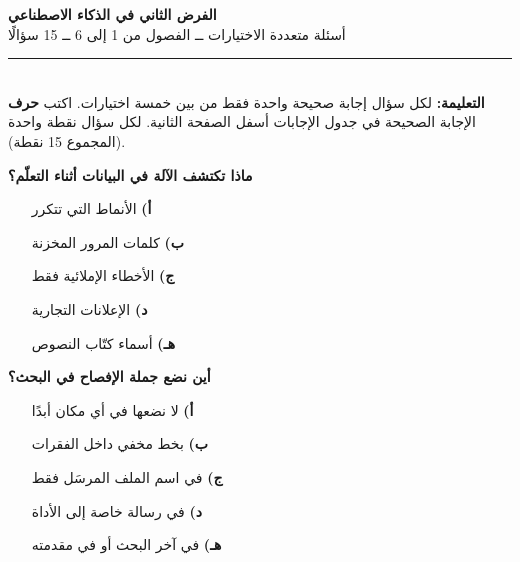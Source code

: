 \documentclass[11pt,a4paper]{article}
\begin{document}
\begin{center}
{\Large\khatt\textbf{الفرض الثاني في الذكاء الاصطناعي}}\\[2pt]
{\normalsize أسئلة متعددة الاختيارات ــ الفصول من 1 إلى 6 ــ 15 سؤالًا}
\end{center}
\vspace{-4pt}\rule{\textwidth}{0.6pt}\\
{\small\textbf{التعليمة:} لكل سؤال إجابة صحيحة واحدة فقط من بين خمسة اختيارات.
اكتب \textbf{حرف} الإجابة الصحيحة في جدول الإجابات أسفل الصفحة الثانية.
لكل سؤال نقطة واحدة (المجموع 15 نقطة).}
\vspace{-2pt}
\begin{multicols}{2}

\noindent\begin{minipage}{\linewidth}
\hangindent=0.7cm\textbf{ماذا تكتشف الآلة في البيانات أثناء التعلّم؟}
\begin{itemize}[leftmargin=0.95cm, labelsep=4pt, itemsep=0pt, topsep=2pt, parsep=0pt]
  \item[\textbf{أ)}] الأنماط التي تتكرر
  \item[\textbf{ب)}] كلمات المرور المخزنة
  \item[\textbf{ج)}] الأخطاء الإملائية فقط
  \item[\textbf{د)}] الإعلانات التجارية
  \item[\textbf{هـ)}] أسماء كتّاب النصوص
\end{itemize}
\end{minipage}\par\vspace{7pt plus 4pt}
\noindent\begin{minipage}{\linewidth}
\hangindent=0.7cm\textbf{أين نضع جملة الإفصاح في البحث؟}
\begin{itemize}[leftmargin=0.95cm, labelsep=4pt, itemsep=0pt, topsep=2pt, parsep=0pt]
  \item[\textbf{أ)}] لا نضعها في أي مكان أبدًا
  \item[\textbf{ب)}] بخط مخفي داخل الفقرات
  \item[\textbf{ج)}] في اسم الملف المرسَل فقط
  \item[\textbf{د)}] في رسالة خاصة إلى الأداة
  \item[\textbf{هـ)}] في آخر البحث أو في مقدمته
\end{itemize}
\end{minipage}\par\vspace{7pt plus 4pt}

\end{multicols}
\end{document}
